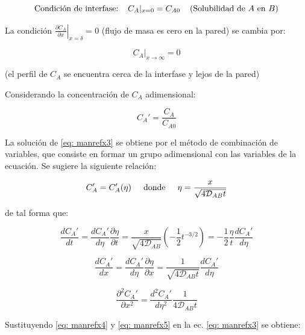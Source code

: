 \begin{equation}
	 \text{Condición de interfase:} \hspace{0.4cm} C_A|_{x=0} = C_{A0} \hspace{0.4cm} \text{(Solubilidad de $A$ en $B$)}
\end{equation}

La condición $\left. \frac{\partial C_A}{\partial x} \right|_{x = \delta} = 0$ (flujo de masa es cero en la pared) se cambia por:

\begin{equation}
	C_A|_{x \to \infty} = 0
\end{equation}

(el perfil de $C_A$ se encuentra cerca de la interfase y lejos de la pared)

Considerando la concentración de $C_A$ adimensional:

\begin{equation}
	C_A' = \frac{C_A}{C_{A0}}
\end{equation}

La solución de \eqref{eq: manrefx3} se obtiene por el método de combinación de variables, que consiste en formar un grupo adimensional con las variables de la ecuación. Se sugiere la siguiente relación:

\begin{equation}
	C_A' = C_A'(\eta) \hspace{0.5cm} \text{donde} \hspace{0.5cm} \eta = \frac{x}{\sqrt{4 \mathcal{D}_{AB} t}}
\end{equation}

de tal forma que:

\begin{equation} \label{eq: manrefx4}
	\frac{d C_A'}{dt} = \frac{d C_A'}{d \eta} \frac{\partial \eta}{\partial t} = \frac{x}{\sqrt{4 \mathcal{D}_{AB}}} \left( - \frac{1}{2} t^{-3/2}  \right) = - \frac{1}{2} \frac{\eta}{t} \frac{d C_A'}{d \eta}
\end{equation}

$$\frac{dC_A'}{dx} = \frac{dC_A'}{d \eta} \frac{\partial \eta}{\partial x} = \frac{1}{\sqrt{4 \mathcal{D}_{AB} t}} \frac{dC_A'}{d \eta}$$

\begin{equation} \label{eq: manrefx5}
	\frac{\partial^2 C_A'}{\partial x^2} =  \frac{d^2 C_A'}{d \eta^2} \frac{1}{4 \mathcal{D}_{AB}t}
\end{equation}

Sustituyendo \eqref{eq: manrefx4} y \eqref{eq: manrefx5} en la ec. \eqref{eq: manrefx3} se obtiene: 

